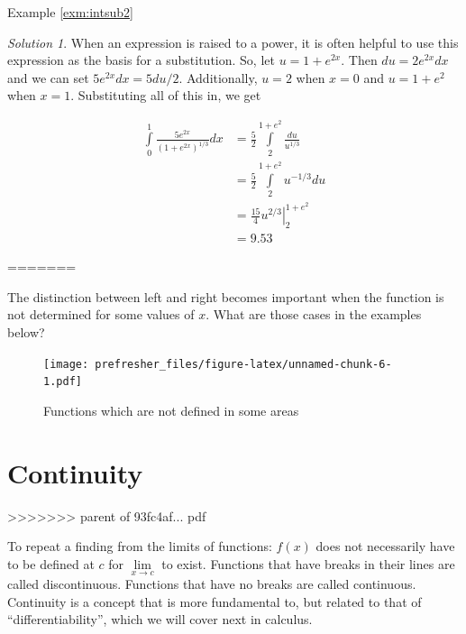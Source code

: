\documentclass[]{book}
\theoremstyle{definition}
\theoremstyle{definition}
\theoremstyle{definition}
\theoremstyle{remark}
\newtheorem*{solution}{Solution}
\begin{document}
Example \ref{exm:intsub2}
\begin{solution}
{}When an expression is raised to a power, it is often helpful to use this expression as the basis for a substitution. So, let \(u=1+e^{2x}\). Then \(du=2e^{2x}dx\) and we can set \(5e^{2x}dx=5du/2\). Additionally, \(u=2\) when \(x=0\) and \(u=1+e^2\) when \(x=1\). Substituting all of this in, we get

\begin{align*}
\int\limits_0^1 \frac{5e^{2x}}{(1+e^{2x})^{1/3}}dx
            &= \frac{5}{2}\int\limits_2^{1+e^2}\frac{du}{u^{1/3}}\\
            &= \frac{5}{2}\int\limits_2^{1+e^2} u^{-1/3}du\\
            &= \left. \frac{15}{4} u^{2/3} \right|_2^{1+e^2}\\
            &= 9.53
\end{align*}
\end{solution}
=======

The distinction between left and right becomes important when the function is not determined for some values of \(x\). What are those cases in the examples below?

\begin{figure}
\centering
\texttt{[image: prefresher\_files/figure-latex/unnamed-chunk-6-1.pdf]}
\caption{\label{fig:unnamed-chunk-6}Functions which are not defined in some areas}
\end{figure}

\hypertarget{continuity}{%
\section{Continuity}\label{continuity}}
>>>>>>> parent of 93fc4af... pdf

To repeat a finding from the limits of functions: \(f(x)\) does not necessarily have to be defined at \(c\) for \(\lim\limits_{x \to c}\) to exist. Functions that have breaks in their lines are called discontinuous. Functions that have no breaks are called continuous. Continuity is a concept that is more fundamental to, but related to that of ``differentiability'', which we will cover next in calculus.
\end{document}
